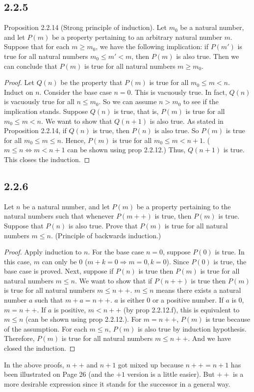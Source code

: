 \documentclass[12pt, letter]{article}
\begin{document}
\subsection*{2.2.5}
Proposition 2.2.14 (Strong principle of induction). Let $m_0$ be a natural number, and let $P(m)$ be a property pertaining to an arbitrary natural 
number $m$. Suppose that for each $m\geq m_0$, we have the following implication: if $P(m')$ is true for all natural numbers $m_0\leq m'<m$, then $P(m)$ is also true.
Then we can conclude that $P(m)$ is true for all natural numbers $m\geq m_0$.
\begin{proof}
    Let $Q(n)$ be the property that $P(m)$ is true for all $m_0\leq m<n$. Induct on $n$. 
    Consider the base case $n=0$. This is vacuously true. In fact, $Q(n)$ is vacuously true for all $n \leq m_0$. So we can assume $n>m_0$ to see if the implication stands. Suppose $Q(n)$ is true, that is, $P(m)$ is true for all $m_0\leq m<n$. 
    We want to show that $Q(n+1)$ is also true. As stated in Proposition 2.2.14, if $Q(n)$ is true, then $P(n)$ is also true. 
    So $P(m)$ is true for all $m_0\leq m\leq n$. Hence, $P(m)$ is true for all $m_0\leq m<n+1$. ($m\leq n \Leftrightarrow m<n+1$ can be shown using prop 2.2.12.) Thus, $Q(n+1)$ is true. This closes the induction.
\end{proof}
\subsection*{2.2.6}
Let $n$ be a natural number, and let $P(m)$ be a property pertaining to the natural numbers such that whenever $P(m++)$ is true, then $P(m)$
is true. Suppose that $P(n)$ is also true. Prove that $P(m)$ is true for all natural numbers $m\leq n$. (Principle of backwards induction.)
\begin{proof}
    Apply induction to $n$. For the base case $n=0$, suppose $P(0)$ is true. In this case, $m$ can only be 0 ($m+k=0 \Rightarrow m=0,k=0$). Since $P(0)$ is true, 
    the base case is proved. Next, suppose if $P(n)$ is true then $P(m)$ is true for all natural numbers $m\leq n$. We want to show that if $P(n++)$ is true then $P(m)$ is true for all 
    natural numbers $m\leq n++$. $m\leq n$ means there exists a natural number $a$ such that $m+a=n++$. $a$ is either 0 or a positive number. If $a$ is 0, $m=n++$. If $a$ is positive, $m<n++$ (by prop 2.2.12.f), this is equivalent to $m\leq n$ (can be shown using prop 2.2.12.). 
    For $m=n++$, $P(m)$ is true because of the assumption. For each $m\leq n$, $P(m)$ is also true by induction hypothesis. Therefore, $P(m)$ is true for all natural numbers $m\leq n++$. And we have closed the induction.
\end{proof}
In the above proofs, $n++$ and $n+1$ got mixed up because $n++=n+1$ has been illustrated on Page 26 (and the $+1$ version is a little easier). But $++$ is a more desirable expression since it stands for the successor in a general way.
\end{document}
